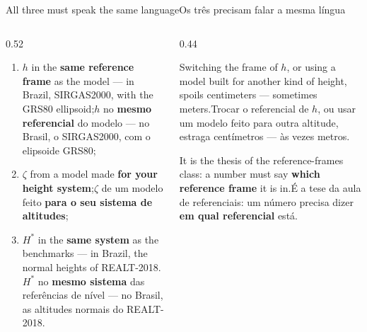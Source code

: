 \documentclass[aspectratio=169,11pt]{beamer}
\newcommand{\tr}[2]{\ifEN#2\else#1\fi}
\newcommand{\bnum}[1]{\textbf{\textcolor{mTeal}{#1}}}
\begin{document}
\begin{frame}{\tr{Os três precisam falar a mesma língua}{All three must speak the same language}}
  \begin{columns}[T]
    \begin{column}{0.52\textwidth}
      \begin{enumerate}
        \setlength{\itemsep}{6pt}
        \item \tr{$h$ no \bnum{mesmo referencial} do modelo --- no Brasil, o SIRGAS2000, com o
              elipsoide GRS80;}{$h$ in the \bnum{same reference frame} as the model --- in
              Brazil, SIRGAS2000, with the GRS80 ellipsoid;}
        \item \tr{$\zeta$ de um modelo feito \bnum{para o seu sistema de altitudes};}{$\zeta$
              from a model made \bnum{for your height system};}
        \item \tr{$H^{*}$ no \bnum{mesmo sistema} das referências de nível --- no Brasil, as
              altitudes normais do REALT-2018.}{$H^{*}$ in the \bnum{same system} as the
              benchmarks --- in Brazil, the normal heights of REALT-2018.}
      \end{enumerate}
    \end{column}
    \begin{column}{0.44\textwidth}
      \begin{armadilha}[title={\tr{Misturar estraga}{Mixing spoils it}}]
        \tr{Trocar o referencial de $h$, ou usar um modelo feito para outra altitude, estraga
        \alert{centímetros --- às vezes metros}.}{Switching the frame of $h$, or using a model
        built for another kind of height, spoils \alert{centimeters --- sometimes meters}.}
      \end{armadilha}
      \medskip
      \tr{É a tese da aula de referenciais: um número precisa dizer \bnum{em qual referencial}
      está.}{It is the thesis of the reference-frames class: a number must say \bnum{which
      reference frame} it is in.}
    \end{column}
  \end{columns}
\end{frame}
\end{document}
